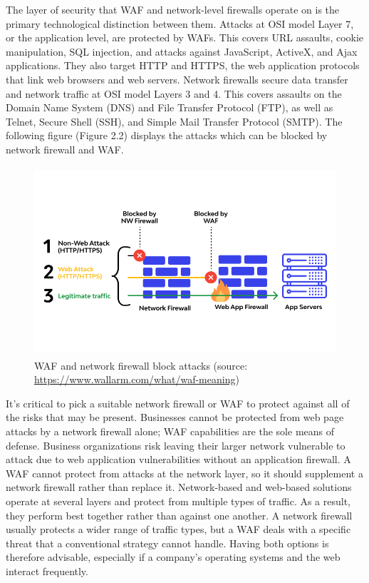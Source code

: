 The layer of security that WAF and network-level firewalls operate on is the primary technological distinction between them. Attacks at OSI model Layer 7, or the application level, are protected by WAFs. This covers URL assaults, cookie manipulation, SQL injection, and attacks against JavaScript, ActiveX, and Ajax applications. They also target HTTP and HTTPS, the web application protocols that link web browsers and web servers. Network firewalls secure data transfer and network traffic at OSI model Layers 3 and 4. This covers assaults on the Domain Name System (DNS) and File Transfer Protocol (FTP), as well as Telnet, Secure Shell (SSH), and Simple Mail Transfer Protocol (SMTP). The following figure (Figure 2.2) displays the attacks which can be blocked by network firewall and WAF.
\begin{figure}[h!]
	\centering
	\includegraphics[width=\linewidth, height=7cm,keepaspectratio]{figures/waf3.png}
	\caption{WAF and network firewall block attacks (source: \url{https://www.wallarm.com/what/waf-meaning})}
\end{figure}
\newpage
It's critical to pick a suitable network firewall or WAF to protect against all of the risks that may be present. Businesses cannot be protected from web page attacks by a network firewall alone; WAF capabilities are the sole means of defense. Business organizations risk leaving their larger network vulnerable to attack due to web application vulnerabilities without an application firewall. A WAF cannot protect from attacks at the network layer, so it should supplement a network firewall rather than replace it. Network-based and web-based solutions operate at several layers and protect from multiple types of traffic. As a result, they perform best together rather than against one another. A network firewall usually protects a wider range of traffic types, but a WAF deals with a specific threat that a conventional strategy cannot handle. Having both options is therefore advisable, especially if a company's operating systems and the web interact frequently.
